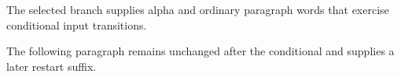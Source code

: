 
\hsize=220pt \vsize=240pt
\iftrue
The selected branch supplies alpha and ordinary paragraph words that exercise conditional input transitions.
\else
The selected branch supplies omega and ordinary paragraph words that exercise conditional input transitions.
\fi

The following paragraph remains unchanged after the conditional and supplies a later restart suffix.
\bye
